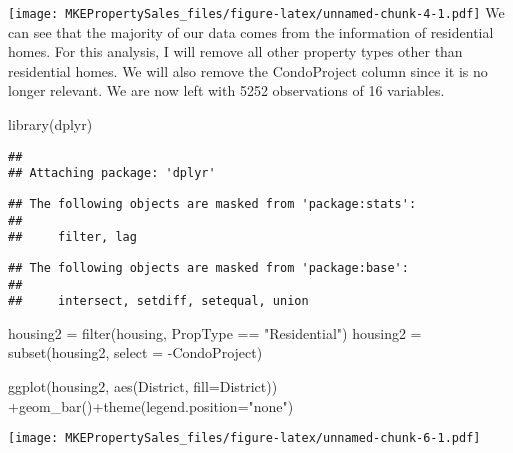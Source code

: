 \documentclass[
]{article}
\newenvironment{Shaded}{\begin{snugshade}}{\end{snugshade}}
\newcommand{\AttributeTok}[1]{\textcolor[rgb]{0.77,0.63,0.00}{#1}}
\newcommand{\FunctionTok}[1]{\textcolor[rgb]{0.00,0.00,0.00}{#1}}
\newcommand{\NormalTok}[1]{#1}
\newcommand{\OtherTok}[1]{\textcolor[rgb]{0.56,0.35,0.01}{#1}}
\newcommand{\SpecialCharTok}[1]{\textcolor[rgb]{0.00,0.00,0.00}{#1}}
\newcommand{\StringTok}[1]{\textcolor[rgb]{0.31,0.60,0.02}{#1}}
\begin{document}
\texttt{[image: MKEPropertySales\_files/figure-latex/unnamed-chunk-4-1.pdf]}
We can see that the majority of our data comes from the information of
residential homes. For this analysis, I will remove all other property
types other than residential homes. We will also remove the CondoProject
column since it is no longer relevant. We are now left with 5252
observations of 16 variables.

\begin{Shaded}
\begin{Highlighting}[]
\FunctionTok{library}\NormalTok{(dplyr)}
\end{Highlighting}
\end{Shaded}

\begin{verbatim}
## 
## Attaching package: 'dplyr'
\end{verbatim}

\begin{verbatim}
## The following objects are masked from 'package:stats':
## 
##     filter, lag
\end{verbatim}

\begin{verbatim}
## The following objects are masked from 'package:base':
## 
##     intersect, setdiff, setequal, union
\end{verbatim}

\begin{Shaded}
\begin{Highlighting}[]
\NormalTok{housing2 }\OtherTok{=} \FunctionTok{filter}\NormalTok{(housing, PropType }\SpecialCharTok{==} \StringTok{"Residential"}\NormalTok{)}
\NormalTok{housing2 }\OtherTok{=} \FunctionTok{subset}\NormalTok{(housing2, }\AttributeTok{select =} \SpecialCharTok{{-}}\NormalTok{CondoProject)}
\end{Highlighting}
\end{Shaded}

\begin{Shaded}
\begin{Highlighting}[]
\FunctionTok{ggplot}\NormalTok{(housing2, }\FunctionTok{aes}\NormalTok{(District, }\AttributeTok{fill=}\NormalTok{District)) }\SpecialCharTok{+}\FunctionTok{geom\_bar}\NormalTok{()}\SpecialCharTok{+}\FunctionTok{theme}\NormalTok{(}\AttributeTok{legend.position=}\StringTok{"none"}\NormalTok{)}
\end{Highlighting}
\end{Shaded}

\texttt{[image: MKEPropertySales\_files/figure-latex/unnamed-chunk-6-1.pdf]}
\end{document}
